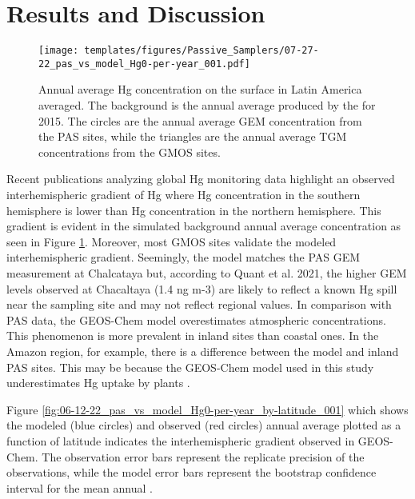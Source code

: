 \section{Results and Discussion}\label{c2_results}

\begin{figure}[H]
\centering
  \texttt{[image: templates/figures/Passive\_Samplers/07-27-22\_pas\_vs\_model\_Hg0-per-year\_001.pdf]}
  \caption{Annual average Hg concentration on the surface in Latin America averaged. The background is the annual average \hgc produced by the \on for 2015. The circles are the annual average GEM concentration from the PAS sites, while the triangles are the annual average TGM concentrations from the GMOS sites.\cite{quant_measuring_2021,sprovieri_atmospheric_2016,koenig_seasonal_2021}}
  \label{fig:06-12-22_pas_vs_model_Hg0-per-year_001}
  
  
\end{figure}
\FloatBarrier
\begin{flushleft}
 Recent publications analyzing global Hg monitoring data highlight an observed interhemispheric gradient of Hg where Hg concentration in the southern hemisphere is lower than Hg concentration in the northern hemisphere\cite{sprovieri_atmospheric_2016}. This gradient is evident in the simulated background annual average \hg concentration as seen in Figure \ref{fig:06-12-22_pas_vs_model_Hg0-per-year_001}. Moreover, most GMOS sites validate the modeled interhemispheric gradient. Seemingly, the model matches the PAS GEM measurement at Chalcataya but, according to Quant et al. 2021, the higher GEM levels observed at Chacaltaya (1.4 ng m-3) are likely to reflect a known Hg spill near the sampling site and may not reflect regional values\cite{quant_measuring_2021}. In comparison with PAS data, the GEOS-Chem model overestimates atmospheric concentrations. This phenomenon is more prevalent in inland sites than coastal ones. In the Amazon region, for example, there is a difference between the model and inland PAS sites. This may be because the GEOS-Chem model used in this study underestimates Hg uptake by plants \cite{feinberg_evaluating_2022}. 
\end{flushleft}
\begin{flushleft}
 
 Figure \ref{fig:06-12-22_pas_vs_model_Hg0-per-year_by-latitude_001} which shows the modeled (blue circles) and observed (red circles) annual average \hg plotted as a function of latitude indicates the interhemispheric gradient observed in GEOS-Chem. The observation error bars represent the replicate precision of the observations, while the model error bars represent the \nft bootstrap confidence interval for the mean annual \hg. 
\end{flushleft}
 
